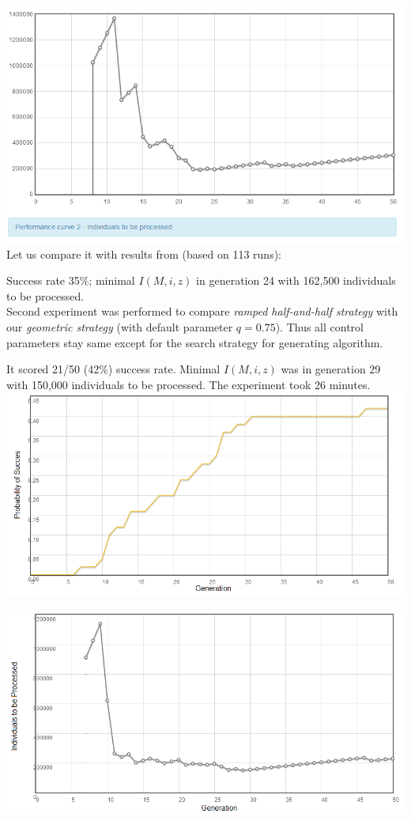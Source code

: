 \documentclass[12pt,a4paper]{report}
\newcommand{\Lets}{Let us\xspace}
\begin{document}
\includegraphics[scale=0.65]{reports/SSR/1/indivs.png}\\

\Lets compare it with results from \cite{koza92} (based on 113 runs):

Success rate 35\%; minimal $I(M,i,z)$ in generation 24 
with 162,500 individuals to be processed.\\



Second experiment was performed to compare 
\textit{ramped half-and-half strategy} with our
\textit{geometric strategy} (with default parameter $q=0.75$). 
Thus all control parameters stay same except for the 
search strategy for generating algorithm.

It scored 21/50 (42\%) success rate. 
Minimal $I(M,i,z)$ was in generation 29 
with 150,000 individuals to be processed.
The experiment took 26 minutes.\\


\includegraphics[scale=0.65]{reports/SSR/2/probabs.png}

\includegraphics[scale=0.65]{reports/SSR/2/indivs.png}\\
\end{document}
